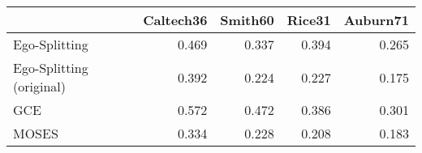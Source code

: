\begin{tabular}{lrrrr}
\toprule
{} & Caltech36 & Smith60 & Rice31 & Auburn71 \\
\midrule
Ego-Splitting            &     0.469 &   0.337 &  0.394 &    0.265 \\
Ego-Splitting (original) &     0.392 &   0.224 &  0.227 &    0.175 \\
GCE                      &     0.572 &   0.472 &  0.386 &    0.301 \\
MOSES                    &     0.334 &   0.228 &  0.208 &    0.183 \\
\bottomrule
\end{tabular}
